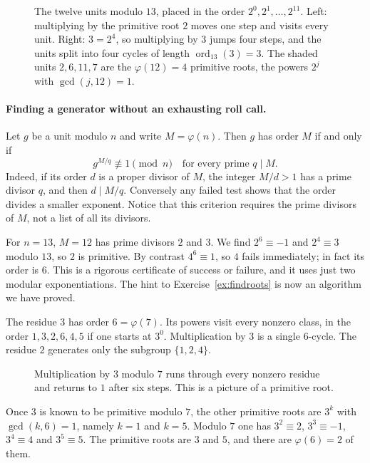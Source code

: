 \begin{figure}[ht]
\centering
{}
\caption{The twelve units modulo $13$, placed in the order $2^0,2^1,\dots,2^{11}$. Left: multiplying by the primitive root $2$ moves one step and visits every unit. Right: $3=2^4$, so multiplying by $3$ jumps four steps, and the units split into four cycles of length $\operatorname{ord}_{13}(3)=3$. The shaded units $2,6,11,7$ are the $\varphi(12)=4$ primitive roots, the powers $2^j$ with $\gcd(j,12)=1$.}
\label{fig:primroot}
\end{figure}

\paragraph{Finding a generator without an exhausting roll call.}
Let $g$ be a unit modulo $n$ and write $M=\varphi(n)$. Then $g$ has order
$M$ if and only if
\[
 g^{M/q}\not\equiv1\pmod n
 \quad\text{for every prime }q\mid M.
\]
Indeed, if its order $d$ is a proper divisor of $M$, the integer $M/d>1$
has a prime divisor $q$, and then $d\mid M/q$. Conversely any failed test
shows that the order divides a smaller exponent. Notice that this criterion
requires the prime divisors of $M$, not a list of all its divisors.

For $n=13$, $M=12$ has prime divisors $2$ and $3$. We find
$2^6\equiv-1$ and $2^4\equiv3$ modulo $13$, so $2$ is primitive.
By contrast $4^6\equiv1$, so $4$ fails immediately; in fact its order is $6$.
This is a rigorous certificate of success or failure, and it uses just two
modular exponentiations. The hint to Exercise~\ref{ex:findroots} is now an
algorithm we have proved.

\begin{examplex}
The residue $3$ has order $6=\varphi(7)$. Its powers visit every nonzero class, in the order $1,3,2,6,4,5$ if one starts at $3^0$. Multiplication by $3$ is a single $6$-cycle. The residue $2$ generates only the subgroup $\{1,2,4\}$.
\end{examplex}

\begin{figure}[ht]
\centering
{}
\caption{Multiplication by $3$ modulo $7$ runs through every nonzero residue and returns to $1$ after six steps. This is a picture of a primitive root.}
\label{fig:t1-cycle}
\end{figure}

\begin{examplex}
Once $3$ is known to be primitive modulo $7$, the other primitive roots are $3^k$ with $\gcd(k,6)=1$, namely $k=1$ and $k=5$. Modulo $7$ one has $3^2\equiv 2$, $3^3\equiv -1$, $3^4\equiv 4$ and $3^5\equiv 5$. The primitive roots are $3$ and $5$, and there are $\varphi(6)=2$ of them.
\end{examplex}

